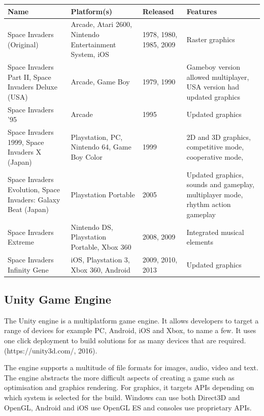 \documentclass[12pt]{article}
\begin{document}
\begin{center}
    \begin{tabular}{ | p{2.25cm} | p{2.5cm} | p{1.5cm} | p{4cm} |} \hline
    Name & Platform(s) & Released & Features \\ \hline
    Space Invaders (Original) & Arcade, Atari 2600, Nintendo Entertainment System, iOS & 1978, 1980, 1985, 2009 & Raster graphics \\ \hline
    
    Space Invaders Part II, Space Invaders Deluxe (USA) & Arcade, Game Boy & 1979, 1990 & Gameboy version allowed multiplayer, USA version had updated graphics\\ \hline
    
    Space Invaders '95 & Arcade & 1995 & Updated graphics  \\ \hline
    
	Space Invaders 1999, Space Invaders X (Japan) & Playstation, PC, Nintendo 64, Game Boy Color & 1999 & 2D and 3D graphics, competitive mode, cooperative mode,   \\ \hline 
	
	Space Invaders Evolution, Space Invaders: Galaxy Beat (Japan) & Playstation Portable & 2005 & Updated graphics, sounds and gameplay, multiplayer mode, rhythm action gameplay \\ \hline
	
	Space Invaders Extreme & Nintendo DS, Playstation Portable, Xbox 360 & 2008, 2009 & Integrated musical elements \\ \hline
	
	Space Invaders Infinity Gene & iOS, Playstation 3, Xbox 360, Android & 2009, 2010, 2013 & Updated graphics\\ \hline
    \end{tabular}
\end{center}

\newpage
\begin{center}
\subsection{Unity Game Engine}
\end{center}
The Unity engine is a multiplatform game engine. It allows developers to target a range of devices for example PC, Android, iOS and Xbox, to name a few. It uses one click deployment to build solutions for as many devices that are required. (https://unity3d.com/, 2016).

The engine supports a multitude of file formats for images, audio, video and text. The engine abstracts the more difficult aspects of creating a game such as optimisation and graphics rendering. For graphics, it targets APIs depending on which system is selected for the build. Windows can use both Direct3D and OpenGL, Android and iOS use OpenGL ES and consoles use proprietary APIs.
\end{document}
